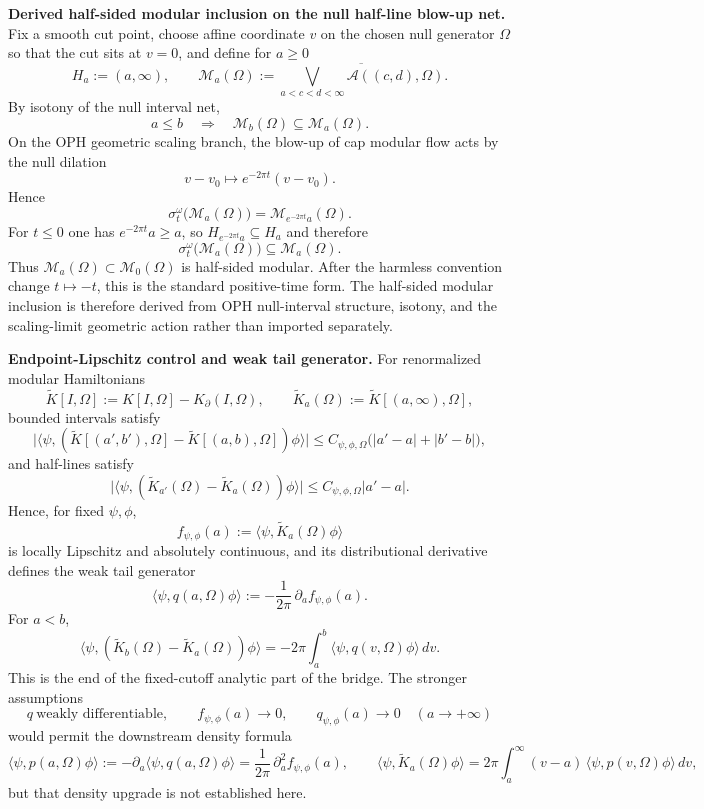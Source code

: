 \textbf{Derived half-sided modular inclusion on the null half-line blow-up net.} Fix a smooth cut point, choose affine coordinate \(v\) on the chosen null generator \(\Omega\) so that the cut sits at \(v=0\), and define for \(a\ge 0\)
\[
H_a:=(a,\infty),
\qquad
\mathcal M_a(\Omega)
:=
\overline{\bigvee_{a<c<d<\infty}\mathcal A((c,d),\Omega)}.
\]
By isotony of the null interval net,
\[
a\le b
\quad\Longrightarrow\quad
\mathcal M_b(\Omega)\subseteq \mathcal M_a(\Omega).
\]
On the OPH geometric scaling branch, the blow-up of cap modular flow acts by the null dilation
\[
v-v_0\mapsto e^{-2\pi t}(v-v_0).
\]
Hence
\[
\sigma_t^\omega\bigl(\mathcal M_a(\Omega)\bigr)
=
\mathcal M_{e^{-2\pi t}a}(\Omega).
\]
For \(t\le 0\) one has \(e^{-2\pi t}a\ge a\), so \(H_{e^{-2\pi t}a}\subseteq H_a\) and therefore
\[
\sigma_t^\omega\bigl(\mathcal M_a(\Omega)\bigr)\subseteq \mathcal M_a(\Omega).
\]
Thus \(\mathcal M_a(\Omega)\subset \mathcal M_0(\Omega)\) is half-sided modular. After the harmless convention change \(t\mapsto -t\), this is the standard positive-time form. The half-sided modular inclusion is therefore derived from OPH null-interval structure, isotony, and the scaling-limit geometric action rather than imported separately.

\textbf{Endpoint-Lipschitz control and weak tail generator.} For renormalized modular Hamiltonians
\[
\widetilde K[I,\Omega]
:=
K[I,\Omega]-K_\partial(I,\Omega),
\qquad
\widetilde K_a(\Omega):=\widetilde K[(a,\infty),\Omega],
\]
bounded intervals satisfy
\[
\bigl|
\langle\psi,(\widetilde K[(a',b'),\Omega]-\widetilde K[(a,b),\Omega])\phi\rangle
\bigr|
\le
C_{\psi,\phi,\Omega}\bigl(|a'-a|+|b'-b|\bigr),
\]
and half-lines satisfy
\[
\bigl|
\langle\psi,(\widetilde K_{a'}(\Omega)-\widetilde K_a(\Omega))\phi\rangle
\bigr|
\le
C_{\psi,\phi,\Omega}|a'-a|.
\]
Hence, for fixed \(\psi,\phi\),
\[
f_{\psi,\phi}(a):=\langle\psi,\widetilde K_a(\Omega)\phi\rangle
\]
is locally Lipschitz and absolutely continuous, and its distributional derivative defines the weak tail generator
\[
\langle\psi,q(a,\Omega)\phi\rangle
:=
-\frac{1}{2\pi}\,\partial_a f_{\psi,\phi}(a).
\]
For \(a<b\),
\[
\langle\psi,(\widetilde K_b(\Omega)-\widetilde K_a(\Omega))\phi\rangle
=
-2\pi\int_a^b \langle\psi,q(v,\Omega)\phi\rangle\,dv.
\]
This is the end of the fixed-cutoff analytic part of the bridge. The stronger assumptions
\[
q \ \text{weakly differentiable},
\qquad
f_{\psi,\phi}(a)\to 0,
\qquad
q_{\psi,\phi}(a)\to 0
\quad (a\to+\infty)
\]
would permit the downstream density formula
\[
\langle\psi,p(a,\Omega)\phi\rangle
:=
-\partial_a\langle\psi,q(a,\Omega)\phi\rangle
=
\frac{1}{2\pi}\,\partial_a^2 f_{\psi,\phi}(a),
\qquad
\langle\psi,\widetilde K_a(\Omega)\phi\rangle
=
2\pi\int_a^\infty (v-a)\,\langle\psi,p(v,\Omega)\phi\rangle\,dv,
\]
but that density upgrade is not established here.

